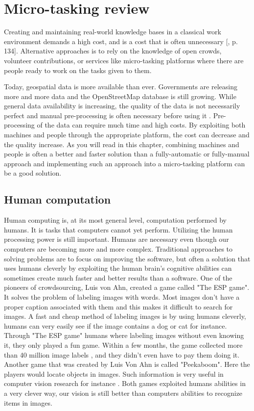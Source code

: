 \chapter{Micro-tasking review}

Creating and maintaining real-world knowledge bases in a classical work environment demands a high cost, and is a cost that is often unnecessary [\citep{Meier2013}, p. 134]. Alternative approaches is to rely on the knowledge of open crowds, volunteer contributions, or services like micro-tasking platforms where there are people ready to work on the tasks given to them.   

Today, geospatial data is more available than ever. Governments are releasing more and more data and the OpenStreetMap database is still growing. While general data availability is increasing, the quality of the data is not necessarily perfect and manual pre-processing is often necessary before using it \citep{Difallah2015}.  Pre-processing of the data can require much time and high costs. By exploiting both machines and people through the appropriate platform, the cost can decrease and the quality increase. As you will read in this chapter, combining machines and people is often a better and faster solution than a fully-automatic or fully-manual approach and implementing such an approach into a micro-tasking platform can be a good solution. 

\section{Human computation}\label{sec:humancomputation}
Human computing is, at its most general level, computation performed by humans. It is tasks that computers cannot yet perform. Utilizing the human processing power is still important. Humans are necessary even though our computers are becoming more and more complex. Traditional approaches to solving problems are to focus on improving the software, but often a solution that uses humans cleverly by exploiting the human brain's cognitive abilities can sometimes create much faster and better results than a software. One of the pioneers of crowdsourcing, Luis von Ahn, created a game called "The ESP game". It solves the problem of labeling images with words. Most images don't have a proper caption associated with them and this makes it difficult to search for images. A fast and cheap method of labeling images is by using humans cleverly, humans can very easily see if the image contains a dog or cat for instance. Through "The ESP game" humans where labeling images without even knowing it, they only played a fun game. Within a few months, the game collected more than 40 million image labels \citep{VonAhn2008}, and they didn't even have to pay them doing it. Another game that was created by Luis Von Ahn is called "Peekaboom". Here the players would locate objects in images. Such information is very useful in computer vision research for instance \citep{VonAhn2008}. Both games exploited humans abilities in a very clever way, our vision is still better than computers abilities to recognize items in images. 

